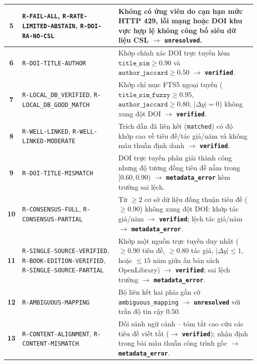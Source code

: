 {\begin{longtable}{|C{0.11}|L{0.33}|L{0.56}|}
\hline
\textbf{5} & \texttt{R-FAIL-ALL}, \texttt{R-RATE-LIMITED-\allowbreak ABSTAIN}, \texttt{R-DOI-RA-NO-CSL} & Không có ứng viên do cạn hạn mức HTTP 429, lỗi mạng hoặc DOI khu vực hợp lệ không công bố siêu dữ liệu CSL $\rightarrow$ \textbf{\texttt{unresolved}}. \\
\hline
\textbf{6} & \texttt{R-DOI-TITLE-AUTHOR} & Khớp chính xác DOI trực tuyến kèm $\texttt{title\_sim} \ge 0.90$ và $\texttt{author\_jaccard} \ge 0.50$ $\rightarrow$ \textbf{\texttt{verified}}. \\
\hline
\textbf{7} & \texttt{R-LOCAL\_DB\_VERIFIED}, \texttt{R-LOCAL\_DB\_GOOD\_MATCH} & Khớp chỉ mục FTS5 ngoại tuyến ($\texttt{title\_sim\_fuzzy} \ge 0.95$, $\texttt{author\_jaccard} \ge 0.80$, $|\Delta y| = 0$) không xung đột DOI $\rightarrow$ \textbf{\texttt{verified}}. \\
\hline
\textbf{8} & \texttt{R-WELL-LINKED}, \texttt{R-WELL-LINKED-\allowbreak MODERATE} & Trích dẫn đã liên kết (\texttt{matched}) có độ khớp cao về tiêu đề/tác giả/năm và không mâu thuẫn định danh $\rightarrow$ \textbf{\texttt{verified}}. \\
\hline
\textbf{9} & \texttt{R-DOI-TITLE-\allowbreak MISMATCH} & DOI trực tuyến phân giải thành công nhưng độ tương đồng tiêu đề nằm trong $[0.60, 0.90)$ $\rightarrow$ \textbf{\texttt{metadata\_error}} kèm trường sai lệch. \\
\hline
\textbf{10} & \texttt{R-CONSENSUS-FULL}, \texttt{R-CONSENSUS-\allowbreak PARTIAL} & Từ $\ge 2$ cơ sở dữ liệu đồng thuận tiêu đề ($\ge 0.90$) không xung đột DOI: khớp tác giả/năm $\rightarrow$ \textbf{\texttt{verified}}; lệch tác giả/năm $\rightarrow$ \textbf{\texttt{metadata\_error}}. \\
\hline
\textbf{11} & \texttt{R-SINGLE-SOURCE-\allowbreak VERIFIED}, \texttt{R-BOOK-EDITION-\allowbreak VERIFIED}, \texttt{R-SINGLE-SOURCE-\allowbreak PARTIAL} & Khớp một nguồn trực tuyến duy nhất ($\ge 0.90$ tiêu đề, $\ge 0.80$ tác giả, $|\Delta y| \le 1$, hoặc $\le 15$ năm giữa ấn bản sách OpenLibrary) $\rightarrow$ \textbf{\texttt{verified}}; sai lệch trường $\rightarrow$ \textbf{\texttt{metadata\_error}}. \\
\hline
\textbf{12} & \texttt{R-AMBIGUOUS-\allowbreak MAPPING} & Bộ liên kết hai phía gắn cờ \texttt{ambiguous\_mapping} $\rightarrow$ \textbf{\texttt{unresolved}} với trần độ tin cậy $0.50$. \\
\hline
\textbf{13} & \texttt{R-CONTENT-\allowbreak ALIGNMENT}, \texttt{R-CONTENT-MISMATCH} & Đối sánh ngữ cảnh -- tóm tắt cao cứu các tiêu đề viết tắt ($\rightarrow$ \textbf{\texttt{verified}}); nhận định trong bài mâu thuẫn công trình gốc $\rightarrow$ \textbf{\texttt{metadata\_error}}. \\

\end{longtable}}
